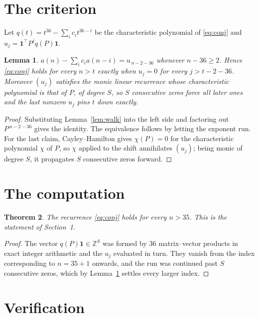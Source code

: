 \documentclass[11pt,a4paper]{article}
\theoremstyle{plain}
\newtheorem{theorem}{Theorem}
\newtheorem{lemma}[theorem]{Lemma}
\theoremstyle{definition}
\begin{document}
\section{The criterion}

Let $q(t)=t^{36}-\sum_i c_i t^{36-i}$ be the characteristic polynomial of
\eqref{eq:conj} and $u_j=\mathbf{1}^{\!\top}P^{j}q(P)\mathbf{1}$.

\begin{lemma}\label{lem:crit}
$a(n)-\sum_i c_i a(n-i)=u_{\,n-2-36}$ whenever $n-36\ge2$. Hence
\eqref{eq:conj} holds for every $n>t$ exactly when $u_j=0$ for every
$j>t-2-36$. Moreover $(u_j)$ satisfies the monic linear recurrence whose
characteristic polynomial is that of $P$, of degree $S$, so $S$ consecutive zeros force all
later ones and the last nonzero $u_j$ pins $t$ down exactly.
\end{lemma}

\begin{proof}
Substituting Lemma~\ref{lem:walk} into the left side and factoring out
$P^{\,n-2-36}$ gives the identity. The equivalence follows by letting the exponent
run. For the last claim, Cayley--Hamilton gives $\chi(P)=0$ for the characteristic
polynomial $\chi$ of $P$, so $\chi$ applied to the shift annihilates $(u_j)$; being monic of
degree $S$, it propagates $S$ consecutive zeros forward.
\end{proof}

\section{The computation}

\begin{theorem}
The recurrence \eqref{eq:conj} holds for every $n>35$. This is the statement of
Section~1.
\end{theorem}

\begin{proof}
The vector $q(P)\mathbf{1}\in\mathbb{Z}^{S}$ was formed by $36$ matrix--vector
products in exact integer arithmetic and the $u_j$ evaluated in turn. They vanish from the
index corresponding to $n=35+1$ onwards, and the run was continued past $S$ consecutive
zeros, which by Lemma~\ref{lem:crit} settles every larger index.
\end{proof}

\section{Verification}
\end{document}
